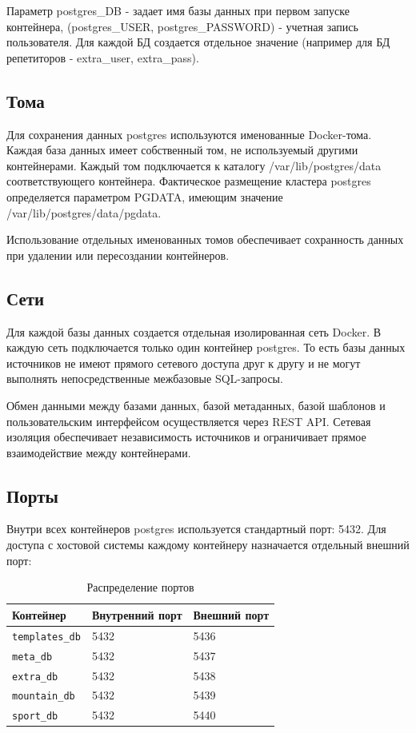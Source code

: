 \documentclass[areasetadvanced]{scrartcl}
\begin{document}
Параметр postgres\_DB - задает имя базы данных при первом запуске контейнера, (postgres\_USER, postgres\_PASSWORD) - учетная запись пользователя.
Для каждой БД создается отдельное значение (например для БД репетиторов - extra\_user, extra\_pass). 


    \subsection{Тома}
    Для сохранения данных postgres используются именованные Docker-тома. Каждая база данных имеет собственный том, не используемый другими контейнерами.
    Каждый том подключается к каталогу /var/lib/postgres/data соответствующего контейнера. Фактическое размещение кластера postgres определяется параметром PGDATA, имеющим значение /var/lib/postgres/data/pgdata.

    Использование отдельных именованных томов обеспечивает сохранность данных при удалении или пересоздании контейнеров.
    \subsection{Сети}
    Для каждой базы данных создается отдельная изолированная сеть Docker. В каждую сеть подключается только один контейнер postgres. То есть базы данных источников не имеют прямого сетевого доступа
    друг к другу и не могут выполнять непосредственные межбазовые SQL-запросы.

    Обмен данными между базами данных, базой метаданных, базой шаблонов и пользовательским интерфейсом осуществляется через REST API. 
    Сетевая изоляция обеспечивает независимость источников и ограничивает прямое взаимодействие между контейнерами.

    \subsection{Порты}
    Внутри всех контейнеров postgres используется стандартный порт: 5432. Для доступа с хостовой системы каждому контейнеру назначается отдельный внешний порт:

    \begin{table}[H]
        \centering
        \caption{Распределение портов}
        \label{tab:ports}
        \begin{tabular}{|l|l|l|}
            \hline
            Контейнер & Внутренний порт & Внешний порт \\
            \hline
            \texttt{templates\_db} & 5432 & 5436 \\
            \hline
            \texttt{meta\_db} & 5432 & 5437 \\
            \hline
            \texttt{extra\_db} & 5432 & 5438 \\
            \hline
            \texttt{mountain\_db} & 5432 & 5439 \\
            \hline
            \texttt{sport\_db} & 5432 & 5440 \\
            \hline
        \end{tabular}
    \end{table}
\end{document}
